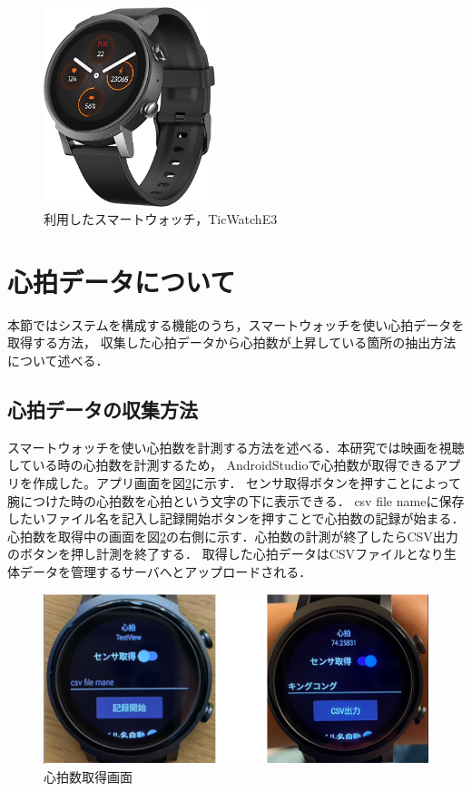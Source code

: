 \begin{figure}[H]
    \centering
    \includegraphics[width=5cm]{images/chapter3/watch.jpg}
    \caption{利用したスマートウォッチ，TicWatchE3}
    \label{watche3}
\end{figure}


\section{心拍データについて}

本節ではシステムを構成する機能のうち，スマートウォッチを使い心拍データを取得する方法，
収集した心拍データから心拍数が上昇している箇所の抽出方法について述べる．

\subsection{心拍データの収集方法}

スマートウォッチを使い心拍数を計測する方法を述べる．本研究では映画を視聴している時の心拍数を計測するため，
AndroidStudioで心拍数が取得できるアプリを作成した。アプリ画面を図\ref{bpmget}に示す．
センサ取得ボタンを押すことによって腕につけた時の心拍数を心拍という文字の下に表示できる．
csv file nameに保存したいファイル名を記入し記録開始ボタンを押すことで心拍数の記録が始まる．
心拍数を取得中の画面を図\ref{bpmget}の右側に示す．心拍数の計測が終了したらCSV出力のボタンを押し計測を終了する．
取得した心拍データはCSVファイルとなり生体データを管理するサーバへとアップロードされる．

\begin{figure}[tbh]
    \centering
    \includegraphics[width=15cm]{images/chapter3/watchgazou.png}
    \caption{心拍数取得画面}
    \label{bpmget}
\end{figure}


